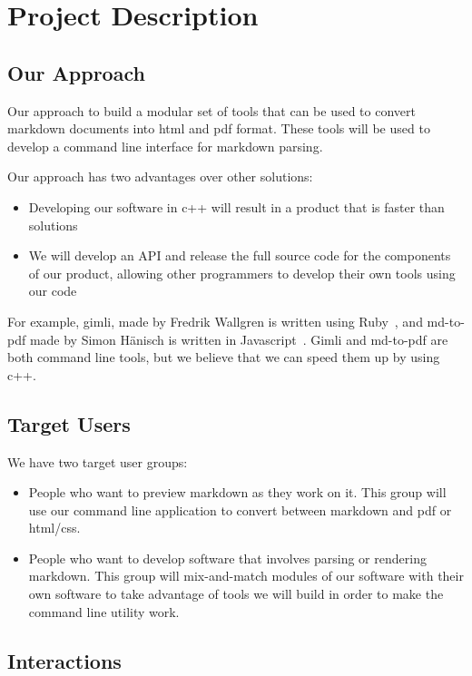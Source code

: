 \section{Project Description}

\subsection{Our Approach}
Our approach to build a modular set of tools that can be used to convert markdown documents into html and pdf format. These tools will be used to develop a command line interface for markdown parsing.

Our approach has two advantages over other solutions:
\begin{itemize}
	\item Developing our software in c++ will result in a product that is faster than solutions
	\item We will develop an API and release the full source code for the components of our product, allowing other programmers to develop their own tools using our code
\end{itemize}
For example, gimli, made by Fredrik Wallgren is written using Ruby~\cite{gimli}, and md-to-pdf made by Simon Hänisch is written in Javascript~\cite{md-to-pdf}. Gimli and md-to-pdf are both command line tools, but we believe that we can speed them up by using c++.

\subsection{Target Users}

We have two target user groups:
\begin{itemize}
  \item People who want to preview markdown as they work on it. This group will use our command line application to convert between markdown and pdf or html/css.
  \item People who want to develop software that involves parsing or rendering markdown. This group will mix-and-match modules of our software with their own software to take advantage of tools we will build in order to make the command line utility work.
\end{itemize}

\subsection{Interactions}

